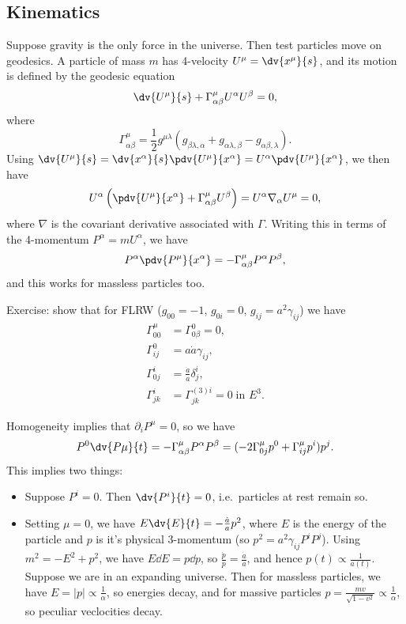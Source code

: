 \documentclass{jknotes}
\begin{document}
\subsection{Kinematics}
Suppose gravity is the only force in the universe. Then test particles move on geodesics. A particle of mass \(m\) has 4-velocity \(U^\mu=\dv{x^\mu}{s}\), and its motion is defined by the geodesic equation
\begin{equation}
    \dv{U^\mu}{s} + \Gamma^\mu_{\alpha\beta} U^\alpha U^\beta = 0,
\end{equation}
where
\begin{equation}
    \Gamma^\mu_{\alpha\beta} = \frac{1}{2}g^{\mu\lambda}(g_{\beta\lambda,\alpha} + g_{\alpha\lambda,\beta} - g_{\alpha\beta,\lambda}).
\end{equation}
Using \(\dv{U^\mu}{s} = \dv{x^\alpha}{s}\pdv{U^\mu}{x^\alpha} = U^\alpha\pdv{U^\mu}{x^\alpha}\), we then have
\begin{equation}
    U^\alpha\left(\pdv{U^\mu}{x^\alpha} + \Gamma^\mu_{\alpha\beta}U^\beta\right) = U^\alpha\nabla_\alpha U^\mu = 0,
\end{equation}
where \(\nabla\) is the covariant derivative associated with \(\Gamma\). Writing this in terms of the 4-momentum \(P^\alpha=m U^\alpha\), we have
\begin{equation}
    P^\alpha \pdv{P^\mu}{x^\alpha} = - \Gamma^\mu_{\alpha\beta}P^\alpha P^\beta,
\end{equation}
and this works for massless particles too.

Exercise: show that for FLRW (\(g_{00}=-1\), \(g_{0i}=0\), \(g_{ij}=a^2\gamma_{ij}\)) we have
\begin{align}
    \Gamma^\mu_{00} &= \Gamma^0_{0\beta} = 0, \\
    \Gamma^0_{ij} &= a\dot{a}\gamma_{ij}, \\
    \Gamma^i_{0j} &= \frac{\dot{a}}{a}\delta_j^i, \\
    \Gamma^i_{jk} &= \Gamma^{(3) i}_{jk} = 0 \; \text{in \(E^3\)}.
\end{align}

Homogeneity implies that \(\partial_i P^\mu=0\), so we have
\begin{equation}
    P^0\dv{P\mu}{t} = -\Gamma^\mu_{\alpha\beta}P^\alpha P^\beta = (-2\Gamma^\mu_{0j}p^0 + \Gamma^\mu_{ij}p^i)p^j.
\end{equation}
This implies two things:
\begin{itemize}
    \item Suppose \(P^i=0\). Then \(\dv{P^i}{t}=0\), i.e.\ particles at rest remain so.
    \item Setting \(\mu=0\), we have \(E\dv{E}{t}=-\frac{\dot{a}}{a}p^2\), where \(E\) is the energy of the particle and \(p\) is it's physical 3-momentum (so \(p^2 = a^2\gamma_{ij}P^iP^j\)). Using \(m^2=-E^2+p^2\), we have \(E\dd{E}=p\dd{p}\), so \(\frac{\dot{p}}{p}=\frac{\dot{a}}{a}\), and hence \(p(t)\propto\frac{1}{a(t)}\). Suppose we are in an expanding universe. Then for massless particles, we have \(E=|p|\propto\frac{1}{\alpha}\), so energies decay, and for massive particles \(p = \frac{mv}{\sqrt{1-v^2}}\propto \frac{1}{\alpha}\), so peculiar veclocities decay.
\end{itemize}
\end{document}
